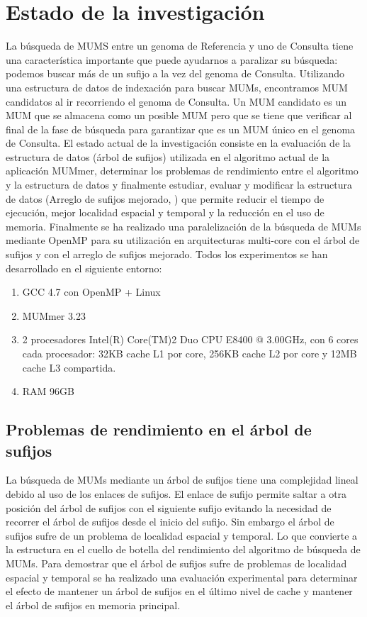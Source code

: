 \documentclass[12pt,a4paper]{article}
\begin{document}
\section{Estado de la investigación}
La búsqueda de MUMS entre un genoma de Referencia y uno de Consulta tiene una característica importante que puede ayudarnos a paralizar su búsqueda: podemos buscar más de un sufijo a la vez del genoma de Consulta. Utilizando una estructura de datos de indexación para buscar MUMs, encontramos MUM candidatos al ir recorriendo el genoma de Consulta. Un MUM candidato es un MUM que se almacena como un posible MUM pero que se tiene que verificar al final de la fase de búsqueda para garantizar que es un MUM único en el genoma de Consulta.
El estado actual de la investigación consiste en la evaluación de la estructura de datos (árbol de sufijos) utilizada en el algoritmo actual de la aplicación MUMmer, determinar los problemas de rendimiento entre el algoritmo y la estructura de datos y finalmente estudiar, evaluar y modificar la estructura de datos (Arreglo de sufijos mejorado, \cite{Abouelhoda2004}) que permite reducir el tiempo de ejecución, mejor localidad espacial y temporal y la reducción en el uso de memoria.
Finalmente se ha realizado una paralelización de la búsqueda de MUMs mediante OpenMP para su utilización en arquitecturas multi-core con el árbol de sufijos y con el arreglo de sufijos mejorado.
Todos los experimentos se han desarrollado en el siguiente entorno:
\begin{enumerate}
\item GCC 4.7 con OpenMP + Linux
\item MUMmer 3.23
\item 2 procesadores Intel(R) Core(TM)2 Duo CPU     E8400  @ 3.00GHz, con 6 cores cada procesador: 32KB cache L1 por core, 256KB cache L2 por core y 12MB cache L3 compartida.
\item RAM 96GB
\end{enumerate}
\subsection{Problemas de rendimiento en el árbol de sufijos}
La búsqueda de MUMs mediante un árbol de sufijos tiene una complejidad lineal debido al uso de los enlaces de sufijos. El enlace de sufijo permite saltar a otra posición del árbol de sufijos con el siguiente sufijo evitando la necesidad de recorrer el árbol de sufijos desde el inicio del sufijo. 
Sin embargo el árbol de sufijos sufre de un problema de localidad espacial y temporal. Lo que convierte a la estructura en el cuello de botella del rendimiento del algoritmo de búsqueda de MUMs.
Para demostrar que el árbol de sufijos sufre de problemas de localidad espacial y temporal se ha realizado una evaluación experimental para determinar el efecto de mantener un árbol de sufijos en el último nivel de cache y mantener el árbol de sufijos en memoria principal.
\end{document}
